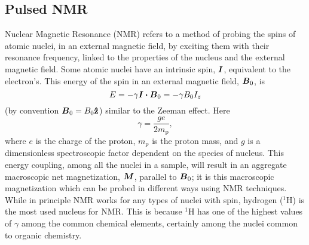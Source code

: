 \documentclass[11pt,a4paper, twocolumn,
swedish, english %
]{article}
\begin{document}
\subsection{Pulsed NMR}

Nuclear Magnetic Resonance (NMR) refers to a method of probing the
spins of atomic nuclei, in an external magnetic field, by exciting
them with their resonance frequency, linked to the properties of the
nucleus and the external magnetic field. Some atomic nuclei have an
intrinsic spin, $\vb*I$, equivalent to the electron's. This energy of
the spin in an external magnetic field, $\vb*B_0$, is
\begin{equation}\label{eq:mag-energy}
E=-\gamma\vb*I\vdot\vb*B_0=-\gamma B_0 I_z
\end{equation}
(by convention $\vb*B_0=B_0\vu{z}$) similar to the Zeeman effect. Here
\begin{equation}
\gamma=\frac{ge}{2m_\text{p}},
\end{equation}
where $e$ is the charge of the proton, $m_\text{p}$ is the proton
mass, and $g$ is a dimensionless spectroscopic factor dependent on the
species of nucleus. This energy coupling, among all the nuclei in a
sample, will result in an aggregate macroscopic net magnetization,
$\vb*M$, parallel to $\vb*B_0$; it is this macroscopic magnetization which
can be probed in different ways using NMR techniques. 
While in principle NMR works for any types of nuclei with spin,
hydrogen ($^1\!$H) is the most used nucleus for NMR. This is because
$^1\!$H has one of the highest values of $\gamma$ among the common
chemical elements, certainly among the nuclei common to organic
chemistry. 
\end{document}
